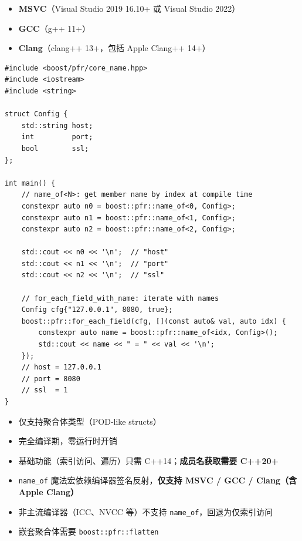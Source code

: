 \documentclass[12pt,a4paper,fontset=fandol]{ctexbook}
\begin{document}
\begin{itemize}[nosep,itemsep=1pt]
  \item \textbf{MSVC}（Visual Studio 2019 16.10+ 或 Visual Studio 2022）
  \item \textbf{GCC}（g++ 11+）
  \item \textbf{Clang}（clang++ 13+，包括 Apple Clang++ 14+）
\end{itemize}

\begin{lstlisting}[caption={Boost.PFR name\_of: 编译期获取成员名 (C++20)}]
#include <boost/pfr/core_name.hpp>
#include <iostream>
#include <string>

struct Config {
    std::string host;
    int         port;
    bool        ssl;
};

int main() {
    // name_of<N>: get member name by index at compile time
    constexpr auto n0 = boost::pfr::name_of<0, Config>;
    constexpr auto n1 = boost::pfr::name_of<1, Config>;
    constexpr auto n2 = boost::pfr::name_of<2, Config>;

    std::cout << n0 << '\n';  // "host"
    std::cout << n1 << '\n';  // "port"
    std::cout << n2 << '\n';  // "ssl"

    // for_each_field_with_name: iterate with names
    Config cfg{"127.0.0.1", 8080, true};
    boost::pfr::for_each_field(cfg, [](const auto& val, auto idx) {
        constexpr auto name = boost::pfr::name_of<idx, Config>();
        std::cout << name << " = " << val << '\n';
    });
    // host = 127.0.0.1
    // port = 8080
    // ssl  = 1
}
\end{lstlisting}

\begin{note}[title={Boost.PFR 技术要点}]
\begin{itemize}[nosep]
  \item 仅支持聚合体类型（POD-like structs）
  \item 完全编译期，零运行时开销
  \item 基础功能（索引访问、遍历）只需 C++14；\textbf{成员名获取需要 C++20+}
  \item \texttt{name\_of} 魔法宏依赖编译器签名反射，\textbf{仅支持 MSVC / GCC / Clang（含 Apple Clang）}
  \item 非主流编译器（ICC、NVCC 等）不支持 \texttt{name\_of}，回退为仅索引访问
  \item 嵌套聚合体需要 \texttt{boost::pfr::flatten}
\end{itemize}
\end{note}
\end{document}

